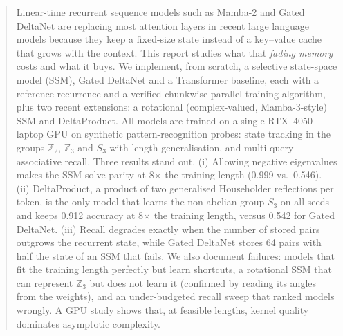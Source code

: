 \begin{abstract}
Linear-time recurrent sequence models such as Mamba-2 and Gated DeltaNet are replacing most attention
layers in recent large language models because they keep a fixed-size state instead of a key--value cache
that grows with the context. This report studies what that \emph{fading memory} costs and what it buys.
We implement, from scratch, a selective state-space model (SSM), Gated DeltaNet and a Transformer baseline,
each with a reference recurrence and a verified chunkwise-parallel training algorithm, plus two recent
extensions: a rotational (complex-valued, Mamba-3-style) SSM and DeltaProduct. All models are trained on a
single RTX~4050 laptop GPU on synthetic pattern-recognition probes: state tracking in the groups
$\mathbb{Z}_2$, $\mathbb{Z}_3$ and $S_3$ with length generalisation, and multi-query associative recall.
Three results stand out. (i) Allowing negative eigenvalues makes the SSM solve parity at 8$\times$ the
training length (0.999 vs.\ 0.546). (ii) DeltaProduct, a product of two generalised Householder
reflections per token, is the only model that learns the non-abelian group $S_3$ on all seeds and keeps
0.912 accuracy at 8$\times$ the training length, versus 0.542 for Gated DeltaNet. (iii) Recall degrades
exactly when the number of stored pairs outgrows the recurrent state, while Gated DeltaNet stores 64 pairs
with half the state of an SSM that fails. We also document failures: models that fit the training length
perfectly but learn shortcuts, a rotational SSM that can represent $\mathbb{Z}_3$ but does not learn it
(confirmed by reading its angles from the weights), and an under-budgeted recall sweep that ranked models
wrongly. A GPU study shows that, at feasible lengths, kernel quality dominates asymptotic complexity.
\end{abstract}

